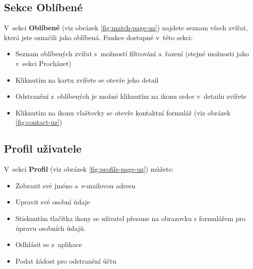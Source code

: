 \documentclass[czech, bp, kiv, he, iso690numb, pdf]{fasthesis}
\begin{document}
    \subsection*{Sekce Oblíbené}

    V~sekci \textbf{Oblíbené} (viz obrázek \ref{fig:match-page-uz}) najdete seznam všech zvířat, která jste označili jako oblíbená. Funkce dostupné v~této sekci:

    \begin{itemize}
        \item Seznam oblíbených zvířat s~možností filtrování a~řazení (stejné možnosti jako v~sekci Procházet)
        \item Kliknutím na kartu zvířete se otevře jeho detail
        \item Odstranění z~oblíbených je možné kliknutím na ikonu srdce v~detailu zvířete
        \item Kliknutím na ikonu vlaštovky se otevře kontaktní formulář (viz obrázek \ref{fig:contact-uz})
    \end{itemize}

    \subsection*{Profil uživatele}

    V~sekci \textbf{Profil} (viz obrázek \ref{fig:profile-page-uz}) můžete:

    \begin{itemize}
        \item Zobrazit své jméno a~e-mailovou adresu
        \item Upravit své osobní údaje
        \item Stisknutím tlačítka ikony  se uživatel přesune na obrazovku s formulářem pro úpravu osobních údajů.
        \item Odhlásit se z~aplikace
        \item Podat žádost pro odstranění účtu
    \end{itemize}
\end{document}
